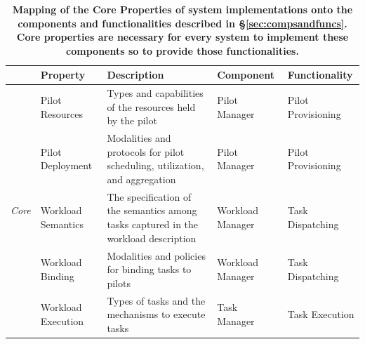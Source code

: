 \documentclass{sig-alternate}
\begin{document}
\begin{table}
\centering
\begin{tabular}{c|p{3.6cm}|p{5cm}|p{2.7cm}|p{2.7cm}|}
\cline{2-5}
                       &
\textbf{Property}      &
\textbf{Description}   &
\textbf{Component}     &
\textbf{Functionality} \\
\hline
\multirow{6}{*}{\textit{Core}}  &
Pilot Resources                 &
Types and capabilities of the resources held by the pilot &
Pilot Manager                   &
Pilot Provisioning \\
\cline{2-5}
                                &
Pilot Deployment                &
Modalities and protocols for pilot scheduling, utilization, and aggregation &
Pilot Manager                   &
Pilot Provisioning \\
\cline{2-5}
                                &
Workload Semantics              &
The specification of the semantics among tasks captured in the workload
description &
Workload Manager                &
Task Dispatching \\
\cline{2-5}
                                &
Workload Binding                &
Modalities and policies for binding tasks to pilots &
Workload Manager                &
Task Dispatching \\
\cline{2-5}
                                &
Workload Execution              &
Types of tasks and the mechanisms to execute tasks &
Task Manager                    &
Task Execution \\
\hline
\end{tabular}
\caption{\textbf{Mapping of the Core Properties of \pilot system implementations
  onto the components and functionalities described in
  \S\ref{sec:compsandfuncs}. Core properties are necessary for every \pilot
  system to implement these components so to provide those functionalities. } }
\label{table:core_properties}
\end{table}
\end{document}
